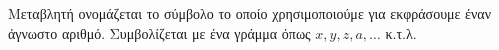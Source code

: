Μεταβλητή ονομάζεται το σύμβολο το οποίο χρησιμοποιούμε για εκφράσουμε έναν άγνωστο αριθμό. Συμβολίζεται με ένα γράμμα όπως $ x,y,z,a,\ldots $ κ.τ.λ.
